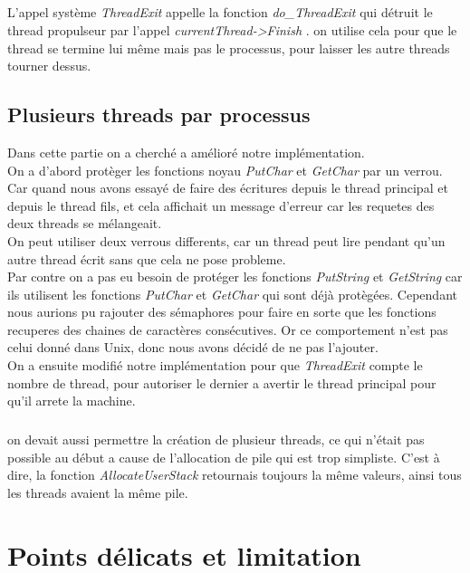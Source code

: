 \documentclass[12pt, a4paper]{report}
\begin{document}
	\paragraph{}
 L'appel système \textit{ ThreadExit } appelle la fonction \textit{ do\_ThreadExit } qui détruit le thread propulseur par l'appel \textit{ currentThread->Finish }. on utilise cela pour que le thread se termine lui même mais pas le processus, pour laisser les autre threads tourner dessus.

\section{Plusieurs threads par processus}

Dans cette partie on a cherché a amélioré notre implémentation. \\   
On a d'abord protèger les fonctions noyau \textit{ PutChar }  et \textit{ GetChar } par un verrou. Car quand nous avons essayé de faire des écritures depuis le thread principal et depuis le thread fils, et cela affichait un message d'erreur car les requetes des deux threads se mélangeait. \\
On peut utiliser deux verrous differents, car un thread peut lire pendant qu'un autre thread écrit sans que cela ne pose probleme.   \\
Par contre on a pas eu besoin de protéger les fonctions \textit{ PutString } et \textit{ GetString } car ils utilisent les fonctions  \textit{ PutChar }  et \textit{ GetChar } qui sont déjà protègées. Cependant nous aurions pu rajouter des sémaphores pour faire en sorte que les fonctions recuperes des chaines de caractères consécutives. Or ce comportement  n'est pas celui donné dans Unix, donc nous avons décidé de ne pas l'ajouter. \\
On a ensuite modifié notre implémentation pour que  \textit{ ThreadExit } compte le nombre de thread, pour autoriser le dernier a avertir le thread principal pour qu'il arrete la machine.
   \paragraph{}
   on devait aussi permettre la création de plusieur threads, ce qui n'était pas possible au début a cause de l'allocation de pile qui est trop simpliste. C'est à dire, la fonction \textit{ AllocateUserStack } retournais toujours la même valeurs, ainsi tous les threads avaient la même pile.

\chapter{Points délicats et limitation }
\end{document}
